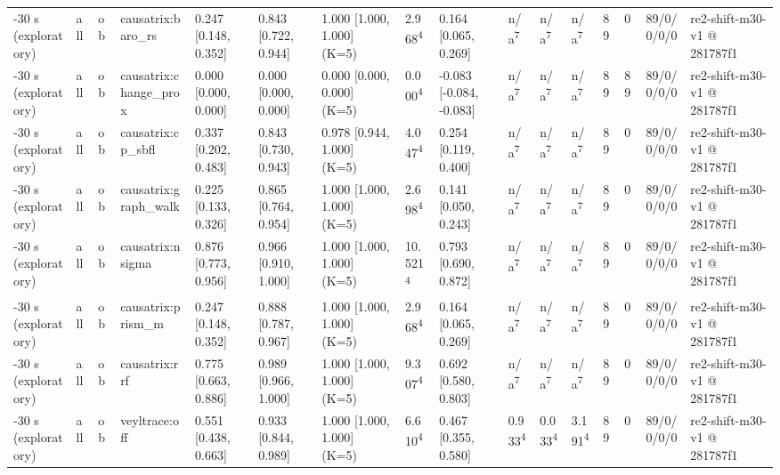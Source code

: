 \begin{table}[t]
\begin{tabular}{llllllllllllllll}
-30 s (exploratory) & all & ob & causatrix:baro\_rs & 0.247 [0.148, 0.352] & 0.843 [0.722, 0.944] & 1.000 [1.000, 1.000] (K=5) & 2.968\textsuperscript{4} & 0.164 [0.065, 0.269] & n/a\textsuperscript{7} & n/a\textsuperscript{7} & n/a\textsuperscript{7} & 89 & 0 & 89/0/0/0/0 & re2-shift-m30-v1 @ 281787f1 \\
-30 s (exploratory) & all & ob & causatrix:change\_prox & 0.000 [0.000, 0.000] & 0.000 [0.000, 0.000] & 0.000 [0.000, 0.000] (K=5) & 0.000\textsuperscript{4} & -0.083 [-0.084, -0.083] & n/a\textsuperscript{7} & n/a\textsuperscript{7} & n/a\textsuperscript{7} & 89 & 89 & 89/0/0/0/0 & re2-shift-m30-v1 @ 281787f1 \\
-30 s (exploratory) & all & ob & causatrix:cp\_sbfl & 0.337 [0.202, 0.483] & 0.843 [0.730, 0.943] & 0.978 [0.944, 1.000] (K=5) & 4.047\textsuperscript{4} & 0.254 [0.119, 0.400] & n/a\textsuperscript{7} & n/a\textsuperscript{7} & n/a\textsuperscript{7} & 89 & 0 & 89/0/0/0/0 & re2-shift-m30-v1 @ 281787f1 \\
-30 s (exploratory) & all & ob & causatrix:graph\_walk & 0.225 [0.133, 0.326] & 0.865 [0.764, 0.954] & 1.000 [1.000, 1.000] (K=5) & 2.698\textsuperscript{4} & 0.141 [0.050, 0.243] & n/a\textsuperscript{7} & n/a\textsuperscript{7} & n/a\textsuperscript{7} & 89 & 0 & 89/0/0/0/0 & re2-shift-m30-v1 @ 281787f1 \\
-30 s (exploratory) & all & ob & causatrix:nsigma & 0.876 [0.773, 0.956] & 0.966 [0.910, 1.000] & 1.000 [1.000, 1.000] (K=5) & 10.521\textsuperscript{4} & 0.793 [0.690, 0.872] & n/a\textsuperscript{7} & n/a\textsuperscript{7} & n/a\textsuperscript{7} & 89 & 0 & 89/0/0/0/0 & re2-shift-m30-v1 @ 281787f1 \\
-30 s (exploratory) & all & ob & causatrix:prism\_m & 0.247 [0.148, 0.352] & 0.888 [0.787, 0.967] & 1.000 [1.000, 1.000] (K=5) & 2.968\textsuperscript{4} & 0.164 [0.065, 0.269] & n/a\textsuperscript{7} & n/a\textsuperscript{7} & n/a\textsuperscript{7} & 89 & 0 & 89/0/0/0/0 & re2-shift-m30-v1 @ 281787f1 \\
-30 s (exploratory) & all & ob & causatrix:rrf & 0.775 [0.663, 0.886] & 0.989 [0.966, 1.000] & 1.000 [1.000, 1.000] (K=5) & 9.307\textsuperscript{4} & 0.692 [0.580, 0.803] & n/a\textsuperscript{7} & n/a\textsuperscript{7} & n/a\textsuperscript{7} & 89 & 0 & 89/0/0/0/0 & re2-shift-m30-v1 @ 281787f1 \\
-30 s (exploratory) & all & ob & veyltrace:off & 0.551 [0.438, 0.663] & 0.933 [0.844, 0.989] & 1.000 [1.000, 1.000] (K=5) & 6.610\textsuperscript{4} & 0.467 [0.355, 0.580] & 0.933\textsuperscript{4} & 0.033\textsuperscript{4} & 3.191\textsuperscript{4} & 89 & 0 & 89/0/0/0/0 & re2-shift-m30-v1 @ 281787f1 \\

\end{tabular}
\end{table}
